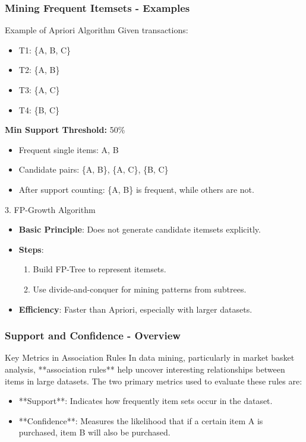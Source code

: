 \documentclass[aspectratio=169]{beamer}
\begin{document}
\begin{frame}[fragile]
    \frametitle{Mining Frequent Itemsets - Examples}
    \begin{block}{Example of Apriori Algorithm}
        Given transactions:
        \begin{itemize}
            \item T1: \{A, B, C\}
            \item T2: \{A, B\}
            \item T3: \{A, C\}
            \item T4: \{B, C\}
        \end{itemize}
        \textbf{Min Support Threshold:} 50\%
        \begin{itemize}
            \item Frequent single items: A, B
            \item Candidate pairs: \{A, B\}, \{A, C\}, \{B, C\}
            \item After support counting: \{A, B\} is frequent, while others are not.
        \end{itemize}
    \end{block}

    \begin{block}{3. FP-Growth Algorithm}
        \begin{itemize}
            \item \textbf{Basic Principle}: Does not generate candidate itemsets explicitly.
            \item \textbf{Steps}:
            \begin{enumerate}
                \item Build FP-Tree to represent itemsets.
                \item Use divide-and-conquer for mining patterns from subtrees.
            \end{enumerate}
            \item \textbf{Efficiency}: Faster than Apriori, especially with larger datasets.
        \end{itemize}
    \end{block}
\end{frame}

\begin{frame}[fragile]
    \frametitle{Support and Confidence - Overview}
    \begin{block}{Key Metrics in Association Rules}
        In data mining, particularly in market basket analysis, **association rules** help uncover interesting relationships between items in large datasets. The two primary metrics used to evaluate these rules are:
        \begin{itemize}
            \item **Support**: Indicates how frequently item sets occur in the dataset.
            \item **Confidence**: Measures the likelihood that if a certain item A is purchased, item B will also be purchased.
        \end{itemize}
    \end{block}
\end{frame}
\end{document}
